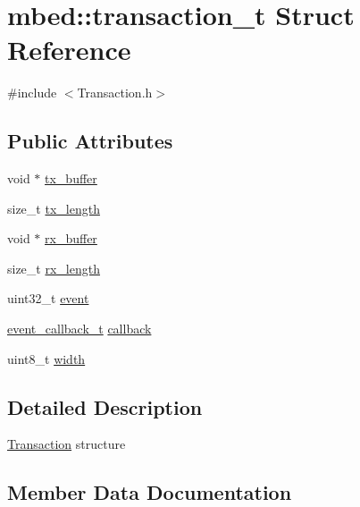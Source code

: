 \hypertarget{structmbed_1_1transaction__t}{}\section{mbed\+:\+:transaction\+\_\+t Struct Reference}
\label{structmbed_1_1transaction__t}


{\ttfamily \#include $<$Transaction.\+h$>$}

\subsection*{Public Attributes}
\begin{DoxyCompactItemize}
\item 
void $\ast$ \hyperlink{structmbed_1_1transaction__t_abacf8c4e26c5bee9e3f45abdb065a46c}{tx\+\_\+buffer}
\item 
size\+\_\+t \hyperlink{structmbed_1_1transaction__t_aa2251489b9b40afc9b6ee367d0c7746d}{tx\+\_\+length}
\item 
void $\ast$ \hyperlink{structmbed_1_1transaction__t_a56698177b98a193cdea584d5d9e83a51}{rx\+\_\+buffer}
\item 
size\+\_\+t \hyperlink{structmbed_1_1transaction__t_afefd7a94e22cadc29445edc25d33ff68}{rx\+\_\+length}
\item 
uint32\+\_\+t \hyperlink{structmbed_1_1transaction__t_ab833266b58930c495adc9ca6ca6ac6ee}{event}
\item 
\hyperlink{classmbed_1_1FunctionPointerArg1}{event\+\_\+callback\+\_\+t} \hyperlink{structmbed_1_1transaction__t_ac002693cf63d9a1a05789c966de5053d}{callback}
\item 
uint8\+\_\+t \hyperlink{structmbed_1_1transaction__t_a07ac843f6ce2f59a3d65d7d8beac1f11}{width}
\end{DoxyCompactItemize}


\subsection{Detailed Description}
\hyperlink{classmbed_1_1Transaction}{Transaction} structure 

\subsection{Member Data Documentation}
